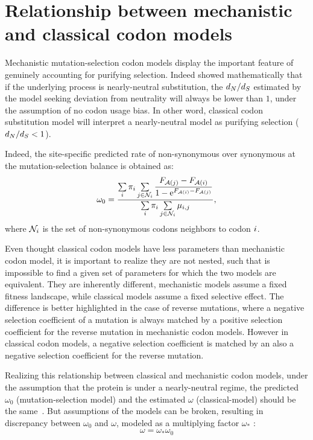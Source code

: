 \section{Relationship between mechanistic and classical codon models}
Mechanistic mutation-selection \gls{codon} models display the important feature of genuinely accounting for purifying selection.
Indeed \citet{Spielman2015} showed mathematically that if the underlying process is \gls{nearly-neutral} \gls{substitution}, the $d_N / d_S$ estimated by the model seeking deviation from neutrality will always be lower than $1$, under the assumption of no \gls{codon} usage bias.
In other word, classical \gls{codon} \gls{substitution} model will interpret a \gls{nearly-neutral} model as purifying selection ($d_N / d_S < 1$).

Indeed, the site-specific predicted rate of non-synonymous over \gls{synonymous} at the mutation-selection balance is obtained as:
\begin{equation}
    \omega_0 = \dfrac{ \sum\limits_{i} \pi_{i} \sum\limits_{j \in \mathcal{N}_{{i}}} \dfrac{F_{\mathcal{A}({j})} - F_{\mathcal{A}({i})}}{1 - \mathrm{e}^{F_{\mathcal{A}({i})} - F_{\mathcal{A}({j})}} }}{\sum\limits_{i} \pi_{i} \sum\limits_{j \in \mathcal{N}_{{i}} } \mu_{{i}, {j}}},
\end{equation}
where $\mathcal{N}_{{i}}$ is the set of non-synonymous \glspl{codon} neighbors to \gls{codon} ${i}$.

Even thought classical \gls{codon} models have less parameters than mechanistic \gls{codon} model, it is important to realize they are not nested, such that is impossible to find a given set of parameters for which the two models are equivalent.
They are inherently different, mechanistic models assume a fixed fitness landscape, while classical models assume a fixed selective effect.
The difference is better highlighted in the case of reverse mutations, where a negative selection coefficient of a mutation is always matched by a positive selection coefficient for the reverse mutation in mechanistic \gls{codon} models.
However in classical \gls{codon} models, a negative selection coefficient is matched by an also a negative selection coefficient for the reverse mutation.

Realizing this relationship between classical and mechanistic \gls{codon} models, under the assumption that the protein is under a \gls{nearly-neutral} regime, the predicted $\omega_0$ (mutation-selection model) and the estimated $\omega$ (classical-model) should be the same~\citep{Spielman2015, Spielman2016}.
But assumptions of the models can be broken, resulting in discrepancy between $\omega_0$ and $\omega$, modeled as a multiplying factor $\omega_*$ \citep{Rodrigue2016}:
\begin{equation}
    \omega = \omega_* \omega_0
\end{equation}

